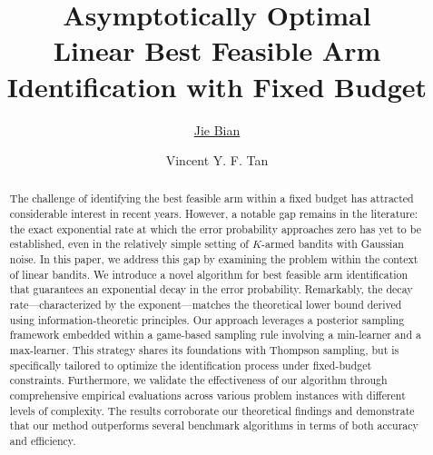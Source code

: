 \documentclass[accepted]{uai2025} %
\title{Asymptotically Optimal \\ Linear Best Feasible Arm Identification with Fixed Budget}
\author[1]{\href{mailto:<jiebian@u.nus.edu>?Subject=Your UAI 2025 paper}{Jie Bian}{}}
\author[2,1]{Vincent Y. F. Tan}
\affil[1]{%
    Department of Electrical and Computer Engineering\\
    National University of Singapore\\
    Singapore
}
\affil[2]{%
    Department of Mathematics\\
    National University of Singapore\\
    Singapore
}
\theoremstyle{plain}
\theoremstyle{definition}
\theoremstyle{remark}
\begin{document}
\maketitle

\begin{abstract}
The challenge of identifying the best feasible arm within a fixed budget has attracted considerable interest in recent years. However, a notable gap remains in the literature: the exact exponential rate at which the error probability approaches zero has yet to be established, even in the relatively simple setting of $K$-armed bandits with Gaussian noise. 
In this paper, we address this gap by examining the problem within the context of linear bandits. We introduce a novel algorithm for best feasible arm identification that guarantees an exponential decay in the error probability. Remarkably, the decay rate—characterized by the exponent—matches the theoretical lower bound derived using information-theoretic principles. 
Our approach leverages a posterior sampling framework embedded within a game-based sampling rule involving a min-learner and a max-learner. This strategy shares its foundations with Thompson sampling, but is specifically tailored to optimize the identification process under fixed-budget constraints. 
Furthermore, we validate the effectiveness of our algorithm through comprehensive empirical evaluations across various problem instances with different levels of complexity. The results corroborate our theoretical findings and demonstrate that our method outperforms several benchmark algorithms in terms of both accuracy and efficiency.
\end{abstract}
\end{document}
